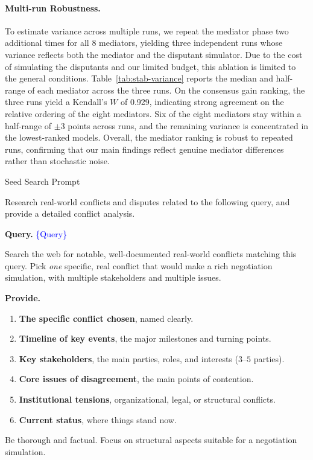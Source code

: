 \paragraph{Multi-run Robustness.}
\label{app:run_variance}
To estimate variance across multiple runs, we repeat the mediator phase two additional times for all 8 mediators, yielding three independent runs whose variance reflects both the mediator and the disputant simulator. Due to the cost of simulating the disputants and our limited budget, this ablation is limited to the general conditions. Table~\ref{tab:stab-variance} reports the median and half-range of each mediator across the three runs. On the consensus gain ranking, the three runs yield a Kendall's $W$ of 0.929, indicating strong agreement on the relative ordering of the eight mediators. Six of the eight mediators stay within a half-range of $\pm 3$ points across runs, and the remaining variance is concentrated in the lowest-ranked models. Overall, the mediator ranking is robust to repeated runs, confirming that our main findings reflect genuine mediator differences rather than stochastic noise.



\clearpage

\begin{table}[p]
\centering
\begin{promptbox}{Seed Search Prompt}
\begin{userbox}
\scriptsize
Research real-world conflicts and disputes related to the following query, and provide a detailed conflict analysis.

\smallskip
\textbf{Query.} \textcolor{blue}{\{Query\}}

\smallskip
Search the web for notable, well-documented real-world conflicts matching this query. Pick \emph{one} specific, real conflict that would make a rich negotiation simulation, with multiple stakeholders and multiple issues.

\smallskip
\textbf{Provide.}
\begin{enumerate}[leftmargin=*, noitemsep, topsep=2pt]
\item \textbf{The specific conflict chosen}, named clearly.
\item \textbf{Timeline of key events}, the major milestones and turning points.
\item \textbf{Key stakeholders}, the main parties, roles, and interests ($3$--$5$ parties).
\item \textbf{Core issues of disagreement}, the main points of contention.
\item \textbf{Institutional tensions}, organizational, legal, or structural conflicts.
\item \textbf{Current status}, where things stand now.
\end{enumerate}

\smallskip
Be thorough and factual. Focus on structural aspects suitable for a negotiation simulation.
\end{userbox}
\end{promptbox}
\vspace{-0.25cm}
\caption{Prompt for seed search.}
\vspace{-0.3cm}
\label{tab:prompt-research}
\end{table}

